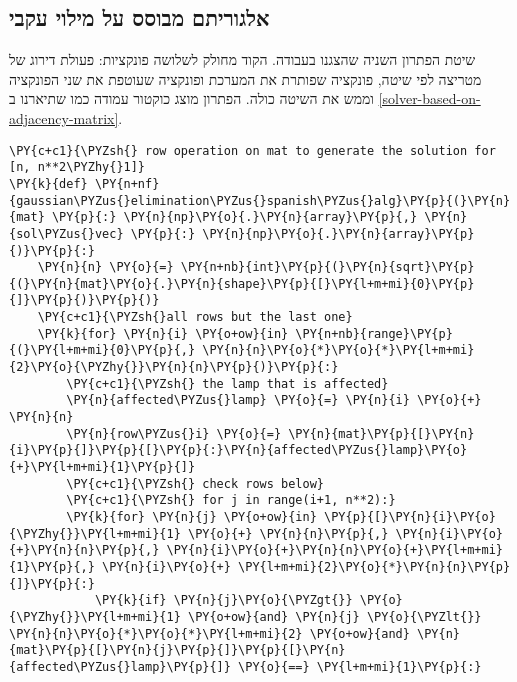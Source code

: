     \hypertarget{solver-based-on-calculating-raw-by-raw}{%
\subsection{אלגוריתם מבוסס על מילוי עקבי}\label{solver-based-on-calculating-raw-by-raw}}
שיטת הפתרון השניה שהצגנו בעבודה.
הקוד מחולק לשלושה פונקציות: פעולת דירוג של מטריצה לפי שיטה, פונקציה שפותרת את המערכת 
ופונקציה שעוטפת את שני הפונקציה וממש את השיטה כולה.
הפתרון מוצג כוקטור עמודה כמו שתיארנו ב
\ref{solver-based-on-adjacency-matrix}.
\begin{english}
    \begin{tcolorbox}[breakable, size=fbox, boxrule=1pt, pad at break*=1mm,colback=cellbackground, colframe=cellborder]
\begin{Verbatim}[commandchars=\\\{\}]
\PY{c+c1}{\PYZsh{} row operation on mat to generate the solution for [n, n**2\PYZhy{}1]}
\PY{k}{def} \PY{n+nf}{gaussian\PYZus{}elimination\PYZus{}spanish\PYZus{}alg}\PY{p}{(}\PY{n}{mat} \PY{p}{:} \PY{n}{np}\PY{o}{.}\PY{n}{array}\PY{p}{,} \PY{n}{sol\PYZus{}vec} \PY{p}{:} \PY{n}{np}\PY{o}{.}\PY{n}{array}\PY{p}{)}\PY{p}{:}
    \PY{n}{n} \PY{o}{=} \PY{n+nb}{int}\PY{p}{(}\PY{n}{sqrt}\PY{p}{(}\PY{n}{mat}\PY{o}{.}\PY{n}{shape}\PY{p}{[}\PY{l+m+mi}{0}\PY{p}{]}\PY{p}{)}\PY{p}{)}
    \PY{c+c1}{\PYZsh{}all rows but the last one}
    \PY{k}{for} \PY{n}{i} \PY{o+ow}{in} \PY{n+nb}{range}\PY{p}{(}\PY{l+m+mi}{0}\PY{p}{,} \PY{n}{n}\PY{o}{*}\PY{o}{*}\PY{l+m+mi}{2}\PY{o}{\PYZhy{}}\PY{n}{n}\PY{p}{)}\PY{p}{:}
        \PY{c+c1}{\PYZsh{} the lamp that is affected}
        \PY{n}{affected\PYZus{}lamp} \PY{o}{=} \PY{n}{i} \PY{o}{+} \PY{n}{n}
        \PY{n}{row\PYZus{}i} \PY{o}{=} \PY{n}{mat}\PY{p}{[}\PY{n}{i}\PY{p}{]}\PY{p}{[}\PY{p}{:}\PY{n}{affected\PYZus{}lamp}\PY{o}{+}\PY{l+m+mi}{1}\PY{p}{]}
        \PY{c+c1}{\PYZsh{} check rows below}
        \PY{c+c1}{\PYZsh{} for j in range(i+1, n**2):}
        \PY{k}{for} \PY{n}{j} \PY{o+ow}{in} \PY{p}{[}\PY{n}{i}\PY{o}{\PYZhy{}}\PY{l+m+mi}{1} \PY{o}{+} \PY{n}{n}\PY{p}{,} \PY{n}{i}\PY{o}{+}\PY{n}{n}\PY{p}{,} \PY{n}{i}\PY{o}{+}\PY{n}{n}\PY{o}{+}\PY{l+m+mi}{1}\PY{p}{,} \PY{n}{i}\PY{o}{+} \PY{l+m+mi}{2}\PY{o}{*}\PY{n}{n}\PY{p}{]}\PY{p}{:}
            \PY{k}{if} \PY{n}{j}\PY{o}{\PYZgt{}} \PY{o}{\PYZhy{}}\PY{l+m+mi}{1} \PY{o+ow}{and} \PY{n}{j} \PY{o}{\PYZlt{}} \PY{n}{n}\PY{o}{*}\PY{o}{*}\PY{l+m+mi}{2} \PY{o+ow}{and} \PY{n}{mat}\PY{p}{[}\PY{n}{j}\PY{p}{]}\PY{p}{[}\PY{n}{affected\PYZus{}lamp}\PY{p}{]} \PY{o}{==} \PY{l+m+mi}{1}\PY{p}{:}

\end{Verbatim}
\end{tcolorbox}
\end{english}
